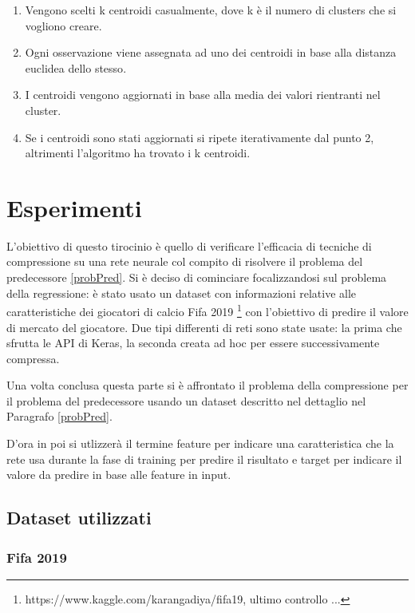 \documentclass[12pt]{report}
\begin{document}
\begin{enumerate}
\item{Vengono scelti k centroidi casualmente, dove k è il numero di clusters che si vogliono creare}.
\item{Ogni osservazione viene assegnata ad uno dei centroidi in base alla distanza euclidea dello stesso}.
\item{I centroidi vengono aggiornati in base alla media dei valori rientranti nel cluster}.
\item{Se i centroidi sono stati aggiornati si ripete iterativamente dal punto 2, altrimenti l’algoritmo ha trovato i k centroidi}.
\end{enumerate}
 

\chapter{Esperimenti}

L'obiettivo di questo tirocinio è quello di verificare l'efficacia di tecniche di compressione su una rete neurale col compito di risolvere il problema del predecessore \ref{probPred}.
Si è deciso di cominciare focalizzandosi sul problema della regressione: è stato usato un dataset con informazioni relative alle caratteristiche dei giocatori di calcio Fifa 2019 \footnote{https://www.kaggle.com/karangadiya/fifa19, ultimo controllo ...} con l’obiettivo di predire il valore di mercato del giocatore. Due tipi differenti di reti sono state usate: la prima che sfrutta le API di Keras, la seconda creata ad hoc per essere successivamente compressa.

Una volta conclusa questa parte si è affrontato il problema della compressione per il problema del predecessore usando un dataset descritto nel dettaglio nel Paragrafo \ref{probPred}.

D'ora in poi si utlizzerà il termine feature per indicare una caratteristica che la rete usa durante la fase di training per predire il risultato e target per indicare il valore da predire in base alle feature in input.

\section{Dataset utilizzati}

\subsection{Fifa 2019}
\end{document}
